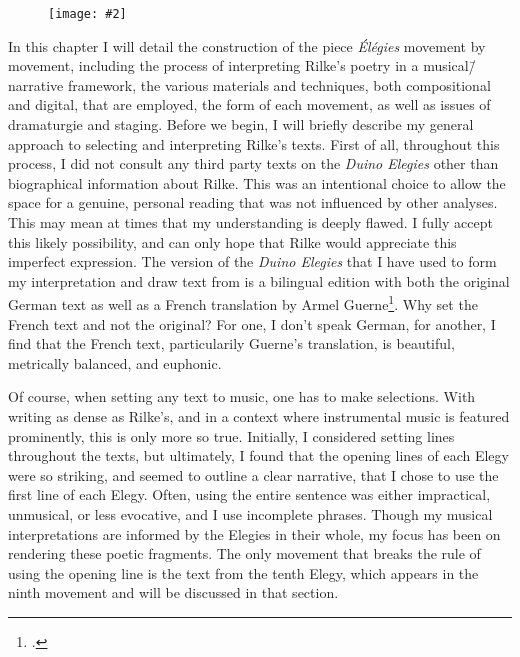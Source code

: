 \documentclass[12pt,twoside,maitrise]{dms_ks}
\newcommand{\customincludegraphics}[4][]{%
    \begin{figure}[H]
        \centering
        \texttt{[image: \#2]}
        \caption{#4}
	\label{#3} 
    \end{figure}
}
\theoremstyle{definition}
\begin{document}
{{\customincludegraphics[scale=0.5]{2024-04-28_MH_sat50.png}{fig:live}{}

In this chapter I will detail the construction of the piece \textit{Élégies} movement by movement, including the process of interpreting Rilke's poetry in a musical\=/narrative framework, the various materials and techniques, both compositional and digital, that are employed, the form of each movement, as well as issues of dramaturgie and staging. Before we begin, I will briefly describe my general approach to selecting and interpreting Rilke's texts. First of all, throughout this process, I did not consult any third party texts on the \textit{Duino Elegies} other than biographical information about Rilke. This was an intentional choice to allow the space for a genuine, personal reading that was not influenced by other analyses. This may mean at times that my understanding is deeply flawed. I fully accept this likely possibility, and can only hope that Rilke would appreciate this imperfect expression. The version of the \textit{Duino Elegies} that I have used to form my interpretation and draw text from is a bilingual edition with both the original German text as well as a French translation by Armel Guerne\footcite{rilke_egies_1986}. Why set the French text and not the original? For one, I don't speak German, for another, I find that the French text, particularily Guerne's translation, is beautiful, metrically balanced, and euphonic.   

Of course, when setting any text to music, one has to make selections. 
With writing as dense as Rilke's, and in a context where instrumental music is featured prominently, this is only more so true. 
Initially, I considered setting lines throughout the texts, but ultimately, I found that the opening lines of each Elegy were so striking, and seemed to outline a clear narrative, that I chose to use the first line of each Elegy. 
Often, using the entire sentence was either impractical, unmusical, or less evocative, and I use incomplete phrases. 
Though my musical interpretations are informed by the Elegies in their whole, my focus has been on rendering these poetic fragments. 
The only movement that breaks the rule of using the opening line is the text from the tenth Elegy, which appears in the ninth movement and will be discussed in that section. 

}}
\end{document}
